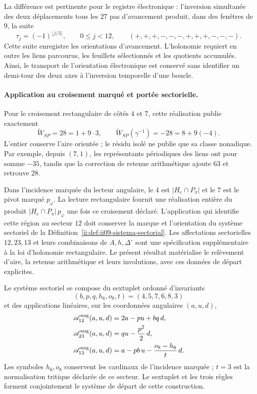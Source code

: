 La différence est pertinente pour le registre électronique : l'inversion
simultanée des deux déplacements tous les $27$ pas d'avancement produit, dans
des fenêtres de $9$, la suite
\[
 \tau_j=(-1)^{\lfloor j/3\rfloor},\qquad 0\leq j<12,
 \qquad (+,+,+,-,-,-,+,+,+,-,-,-).
\]
Cette suite enregistre les orientations d'avancement. L'holonomie requiert
en outre les liens parcourus, les feuillets sélectionnés et les quotients
accumulés. Ainsi, le transport de l'orientation électronique est conservé
sans identifier un demi-tour des deux axes à l'inversion temporelle
d'une boucle.

\paragraph{Application au croisement marqué et portée sectorielle.}
Pour le croisement rectangulaire de côtés $4$ et $7$, cette réalisation publie
exactement
\[
 \widetilde W_{SP}=28=1+9\cdot3,\qquad
 \widetilde W_{SP}(\gamma^{-1})=-28=8+9(-4).
\]
L'entier conserve l'aire orientée ; le résidu isolé ne publie que
sa classe nonadique. Par exemple, depuis $(7,1)$, les représentants
périodiques des liens ont pour somme $-35$, tandis que la correction de
retenue arithmétique ajoute $63$ et retrouve $28$.

Dans l'incidence marquée du lecteur angulaire, le $4$ est
$|H_e\cap P_\pi|$ et le $7$ est le pivot marqué $p_\varphi$.
La lecture rectangulaire fournit une réalisation entière du produit
$|H_e\cap P_\pi|\,p_\varphi$ une fois ce croisement déclaré.
L'application qui identifie cette région au secteur $12$ doit conserver
la marque et l'orientation du système sectoriel de
la Définition~\ref{ii:def:ii09-sistema-sectorial}. Les affectations
sectorielles $12,23,13$ et leurs combinaisons de $A,h,\Delta^\circ$
sont une spécification supplémentaire à la loi d'holonomie rectangulaire.
Le présent résultat matérialise le relèvement d'aire, la retenue arithmétique et
leurs involutions, avec ces données de départ explicites.



\begin{definition}
\label{ii:def:ii09-sistema-sectorial}
Le système sectoriel se compose du sextuplet ordonné d'invariants
\[
 (b,p,q,h_6,o_8,t)=(4,5,7,6,8,3)
\]
et des applications linéaires, sur les coordonnées angulaires
\((a,u,d)\),
\begin{align}
 \mathscr A_{12}^{\rm ang}(a,u,d)&=2a-pu+bq\,d,\label{ii:eq:ii09-sector12}\\
 \mathscr A_{23}^{\rm ang}(a,u,d)&=qu-\frac{p^2}{2}\,d,\label{ii:eq:ii09-sector23}\\
 \mathscr A_{13}^{\rm ang}(a,u,d)&=a-pb\,u-\frac{o_8-h_6}{t}\,d.
 \label{ii:eq:ii09-sector13}
\end{align}
Les symboles \(h_6,o_8\) conservent les cardinaux de l'incidence
marquée ; \(t=3\) est la normalisation tritique déclarée de ce secteur.
Le sextuplet et les trois règles forment conjointement le système de
départ de cette construction.
\end{definition}

